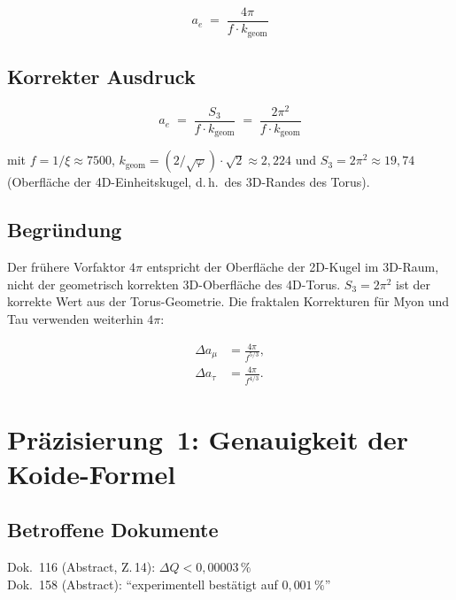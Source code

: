 \begin{equation}
  a_e \;=\; \frac{4\pi}{f \cdot k_{\text{geom}}}
  \tag{alt -- falsch}
\end{equation}

\subsection*{Korrekter Ausdruck}

\begin{equation}
  \boxed{
    a_e \;=\; \frac{S_3}{f \cdot k_{\text{geom}}}
    \;=\; \frac{2\pi^2}{f \cdot k_{\text{geom}}}
  }
  \tag{190.4}
\end{equation}

mit $f = 1/\xi \approx 7500$, $k_{\text{geom}} = (2/\sqrt{\varphi})\cdot\sqrt{2} \approx 2{,}224$
und $S_3 = 2\pi^2 \approx 19{,}74$ (Oberfläche der 4D-Einheitskugel,
d.\,h.\ des 3D-Randes des Torus).

\subsection*{Begründung}

Der frühere Vorfaktor $4\pi$ entspricht der Oberfläche der 2D-Kugel im
3D-Raum, nicht der geometrisch korrekten 3D-Oberfläche des 4D-Torus.
$S_3 = 2\pi^2$ ist der korrekte Wert aus der Torus-Geometrie. Die
fraktalen Korrekturen für Myon und Tau verwenden weiterhin $4\pi$:

\begin{align}
  \Delta a_\mu  &= \frac{4\pi}{f^{5/3}}, \tag{190.5}\\
  \Delta a_\tau &= \frac{4\pi}{f^{4/3}}. \tag{190.6}
\end{align}

\section{Präzisierung~1: Genauigkeit der Koide-Formel}

\subsection*{Betroffene Dokumente}

Dok.~116 (Abstract, Z.\,14): $\Delta Q < 0{,}00003\,\%$ \\
Dok.~158 (Abstract): \enquote{experimentell bestätigt auf $0{,}001\,\%$}

